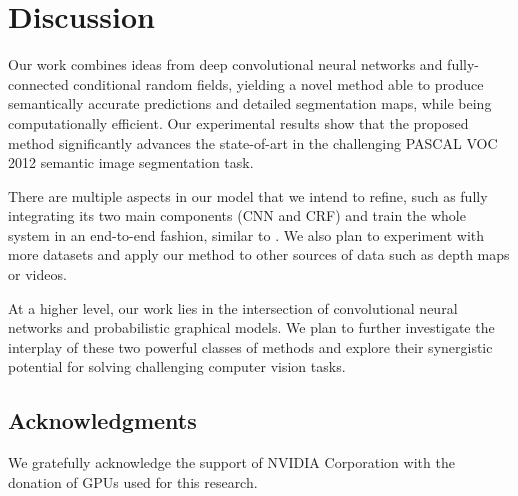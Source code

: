 \section{Discussion}
\label{sec:discussion}

Our work combines ideas from deep convolutional neural networks and
fully-connected conditional random fields, yielding a novel method able to
produce semantically accurate predictions and detailed segmentation maps,
while being computationally efficient. Our experimental results show that the
proposed method significantly advances the state-of-art in the challenging
PASCAL VOC 2012 semantic image segmentation task.

There are multiple aspects in our model that we intend to refine, such as
fully integrating its two main components (CNN and CRF) and train the whole
system in an end-to-end fashion, similar to \citet{Koltun13, chen2014learning}.
We also plan to experiment with more datasets and apply our method to other 
sources of data such as depth maps or videos.

At a higher level, our work lies in the intersection of convolutional neural
networks and probabilistic graphical models. We plan to further investigate
the interplay of these two powerful classes of methods and explore their
synergistic potential for solving challenging computer vision tasks.

\subsection*{Acknowledgments} 

We gratefully acknowledge the support of NVIDIA Corporation with the donation
of GPUs used for this research.
